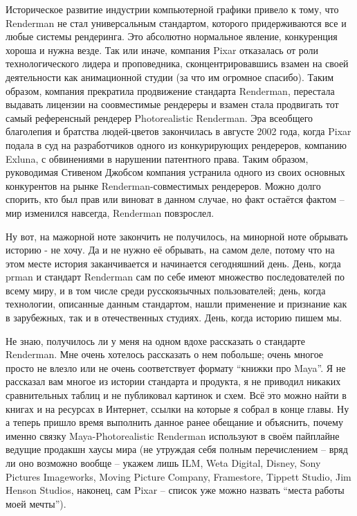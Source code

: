  Историческое развитие индустрии компьютерной
    графики привело к тому, что Renderman не стал универсальным
    стандартом, которого придерживаются все и любые системы рендеринга.
    Это абсолютно нормальное явление, конкуренция хороша и нужна везде.
    Так или иначе, компания Pixar отказалась от роли технологического
    лидера и проповедника, сконцентрировавшись взамен на своей
    деятельности как анимационной студии (за что им огромное спасибо).
    Таким образом, компания прекратила продвижение стандарта Renderman, перестала выдавать лицензии на соовместимые рендереры
    и взамен стала продвигать тот самый референсный рендерер Photorealistic Renderman. Эра всеобщего благолепия и братства людей-цветов закончилась
    в августе 2002 года, когда Pixar подала в суд
    на разработчиков одного из конкурирующих рендереров,
    компанию Exluna, с
    обвинениями в нарушении патентного права. Таким образом,
    руководимая Стивеном Джобсом компания устранила одного из своих
    основных конкурентов на рынке Renderman-совместимых рендереров. Можно долго спорить, кто был прав или
    виноват в данном случае, но факт остаётся фактом – мир изменился
    навсегда, Renderman повзрослел.
  

 Ну вот, на мажорной ноте закончить не получилось,
    на минорной ноте обрывать историю - не хочу. Да и не нужно её
    обрывать, на самом деле, потому что на этом месте история
    заканчивается и начинается сегодняшний день. День, когда prman и стандарт Renderman  сам по себе имеют множество
    последователей по всему миру, и в том числе среди русскоязычных
    пользователей; день, когда технологии, описанные данным стандартом,
    нашли применение и признание как в зарубежных, так и в
    отечественных студиях. День, когда историю пишем мы.
  

 Не знаю, получилось ли у меня  на одном вдохе рассказать о
    стандарте Renderman. Мне
    очень хотелось рассказать о нем побольше; очень многое просто не
    влезло или не очень соответствует формату “книжки про Maya”.
    Я не рассказал вам многое из истории стандарта и продукта, я не
    приводил никаких сравнительных таблиц и не публиковал картинок и
    схем. Всё это можно найти в книгах и на ресурсах в Интернет, ссылки
    на которые я собрал в конце главы. Ну а теперь пришло время
    выполнить данное ранее обещание и объяснить, почему именно
    связку Maya-Photorealistic Renderman используют в своём пайплайне ведущие продакшн хаусы мира (не
    утруждая себя полным перечислением – вряд ли оно возможно вообще –
    укажем лишь ILM, Weta Digital, Disney, Sony Pictures Imageworks, Moving Picture Company, Framestore, Tippett Studio, Jim Henson Studios, наконец,
    сам Pixar – список уже можно назвать “места работы моей
    мечты”).
  


